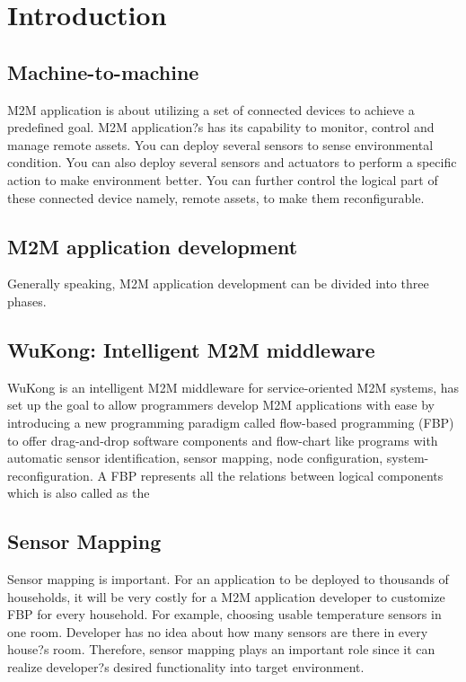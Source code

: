 \chapter{Introduction}
\label{c:intro}

\section{Machine-to-machine}
M2M application is about utilizing a set of connected devices to achieve a predefined goal. M2M application?s has its capability to monitor, control and manage remote assets. You can deploy several sensors to sense environmental condition. You can also deploy several sensors and actuators to perform a specific action to make environment better. You can further control the logical part of these connected device namely, remote assets, to make them reconfigurable.

\section{M2M application development}
Generally speaking, M2M application development can be divided into three phases.

\section{WuKong: Intelligent M2M middleware}
WuKong is an intelligent M2M middleware for service-oriented M2M systems, has set up the goal to allow programmers develop M2M applications with ease by introducing a new programming paradigm called flow-based programming (FBP) to offer drag-and-drop software components and flow-chart like programs with automatic sensor identification, sensor mapping, node configuration, system-reconfiguration. A FBP represents all the relations between logical components which is also called as the 

\section{Sensor Mapping}
Sensor mapping is important. For an application to be deployed to thousands of households, it will be very costly for a M2M application developer to customize FBP for every household. For example, choosing usable temperature sensors in one room. Developer has no idea about how many sensors are there in every house?s room. Therefore, sensor mapping plays an important role since it can realize developer?s desired functionality into target environment.


